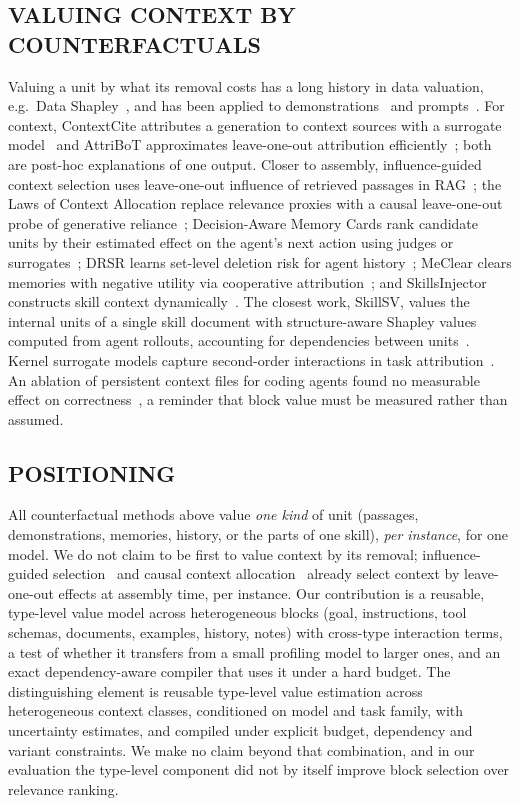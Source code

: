 \subsection{VALUING CONTEXT BY COUNTERFACTUALS}
Valuing a unit by what its removal costs has a long history in data valuation, e.g.\ Data Shapley~\cite{datashapley2019},
and has been applied to demonstrations~\cite{demoshapley2024} and prompts~\cite{promptshapley2023}. For context,
ContextCite attributes a generation to context sources with a surrogate model~\cite{contextcite2024} and AttriBoT
approximates leave-one-out attribution efficiently~\cite{attribot2024}; both are post-hoc explanations of one output.
Closer to assembly, influence-guided context selection uses leave-one-out influence of retrieved passages in
RAG~\cite{civalue2025}; the Laws of Context Allocation replace relevance proxies with a causal leave-one-out probe of
generative reliance~\cite{ctxalloc2026}; Decision-Aware Memory Cards rank candidate units by their estimated effect on the
agent's next action using judges or surrogates~\cite{cicl2026}; DRSR learns set-level deletion risk for agent
history~\cite{drsr2026}; MeClear clears memories with negative utility via cooperative attribution~\cite{meclear2026}; and
SkillsInjector constructs skill context dynamically~\cite{skillsinjector2026}. The closest work, SkillSV, values the
internal units of a single skill document with structure-aware Shapley values computed from agent rollouts, accounting for
dependencies between units~\cite{skillsv2026}. Kernel surrogate models capture second-order interactions in task
attribution~\cite{kernelsurrogate2026}. An ablation of persistent context files for coding agents found no measurable
effect on correctness~\cite{ctxfiles2026}, a reminder that block value must be measured rather than assumed.

\subsection{POSITIONING}
All counterfactual methods above value \emph{one kind} of unit (passages, demonstrations, memories, history, or the parts
of one skill), \emph{per instance}, for one model. We do not claim to be first to value context by its removal; influence-guided selection~\cite{civalue2025} and
causal context allocation~\cite{ctxalloc2026} already select context by leave-one-out effects at assembly time, per
instance. Our
contribution is a reusable, type-level value model across heterogeneous blocks (goal, instructions, tool schemas,
documents, examples, history, notes) with cross-type interaction terms, a test of whether it transfers from a small
profiling model to larger ones, and an exact dependency-aware compiler that uses it under a hard budget. The distinguishing element is reusable type-level value estimation across heterogeneous context classes,
conditioned on model and task family, with uncertainty estimates, and compiled under explicit budget, dependency and
variant constraints. We make no claim beyond that combination, and in our evaluation the type-level component did not
by itself improve block selection over relevance ranking.
